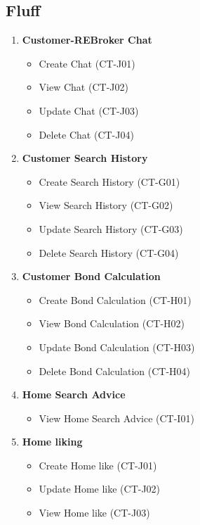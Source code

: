 \documentclass[11pt]{article}
\begin{document}
		\subsection{Fluff}
			\begin{enumerate}[i]
				\item \textbf{Customer-REBroker Chat}
				\begin{itemize}
					\item Create Chat (CT-J01)
					\item View Chat (CT-J02)
					\item Update Chat (CT-J03)
					\item Delete Chat (CT-J04)
				\end{itemize}
				
				\item \textbf{Customer Search History}
				\begin{itemize}
					\item Create Search History (CT-G01)
					\item View Search History (CT-G02)
					\item Update Search History (CT-G03)
					\item Delete Search History (CT-G04)
				\end{itemize}
				
				\item \textbf{Customer Bond Calculation}
				\begin{itemize}
					\item Create Bond Calculation (CT-H01)
					\item View Bond Calculation (CT-H02)
					\item Update Bond Calculation (CT-H03)
					\item Delete Bond Calculation (CT-H04)
				\end{itemize}
				
				\item \textbf{Home Search Advice}
				\begin{itemize}
					\item View Home Search Advice (CT-I01)
				\end{itemize}
				
				\item	\textbf{Home liking}
				\begin{itemize}
					\item Create Home like (CT-J01)
					\item Update Home like (CT-J02)
					\item View Home like (CT-J03)
				\end{itemize}
			\end{enumerate}
		
\end{document}
